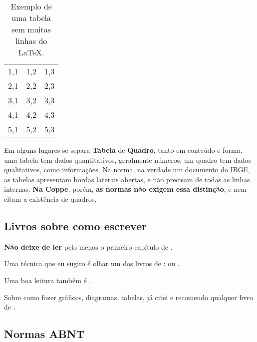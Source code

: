 \documentclass{article}
\begin{document}
\begin{itemize}
\begin{table}[htb]
    \label{tab:tab3}
\end{table}

\begin{table}[htb]
    \centering
        \caption{Exemplo de uma tabela sem muitas linhas do \LaTeX .}
    \begin{tabular}{ccc}
    \hline
        1,1 & 1,2 & 1,3   \\
        2,1 & 2,2 & 2,3\\
        3,1 & 3,2 & 3,3\\
        4,1 & 4,2 & 4,3\\
        5,1 & 5,2 & 5,3\\
        \hline
    \end{tabular}\label{tab:tab4}
\end{table}

Em alguns lugares se separa \textbf{Tabela} de \textbf{Quadro}, tanto em conteúdo e forma, uma tabela tem dados quantitativos, geralmente números, um quadro tem dados qualitativos, como informações. Na norma, na verdade um documento do IBGE\citep{nat}, as tabelas apresentam bordas laterais abertas, e não precisam de todas as linhas internas. \textbf{Na Coppe}, porém, \textbf{as normas não exigem essa distinção}, e nem citam a existência de quadros. 

\subsection{Livros sobre como escrever}    

\textbf{Não deixe de ler} pelo menos o primeiro capítulo de \citep{mw}.

Uma técnica que eu sugiro é olhar um dos  livros de \citeauthor{minto1}:  \citep{minto1} ou \citep{minto2}. 

Uma boa leitura também é \citep{wcs}.

Sobre como fazer gráficos, diagramas, tabelas, já citei \citep{ei} e recomendo qualquer livro de \citeauthor{ei}.

\subsection{Normas ABNT}


\end{itemize}
\end{document}
